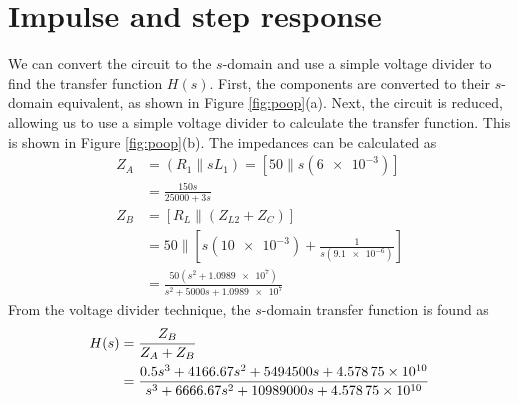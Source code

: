 \documentclass{homework}
\begin{document}
	\section{Impulse and step response}
	We can convert the circuit to the $s$-domain and use a simple voltage divider to find the transfer function $H(s)$. First, the components are converted to their $s$-domain equivalent, as shown in Figure \ref{fig:poop}(a). Next, the circuit is reduced, allowing us to use a simple voltage divider to calculate the transfer function. This is shown in Figure \ref{fig:poop}(b). The impedances can be calculated as \begin{align*}
		Z_A & = \left(R_1 \parallel s L_1\right) = \left[50 \parallel s \left(\num{6e-3}\right)\right] \\
			& = \frac{ 150 s}{25000 + 3 s} \\
		Z_B & = \left[R_L \parallel \left(Z_{L2} + Z_C\right)\right] \\
			& = 50 \parallel \left[s \left(\num{10e-3}\right) + \frac{1}{s \left(\num{9.1e-6}\right)} \right] \\
			& = \frac{ 50 \left(s^2 + \num{1.0989e7}\right) }{ s^2 + 5000 s + \num{1.0989e7}}
	\end{align*}
	From the voltage divider technique, the $s$-domain transfer function is found as \begin{align}
		H(s) & = \frac{Z_B}{Z_A + Z_B} \notag \\
			& = \frac{ 0.5 s^3 + 4166.67 s^2 + 5494500 s + \num{4.57875e10} }{s^3 + 6666.67 s^2 + 10989000 s + \num{4.57875e10}} \label{eq:H}
	\end{align}
\end{document}
